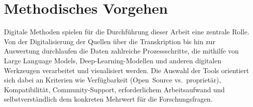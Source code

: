 \documentclass[12pt, a4paper, ngerman, bidi=default]{article}
\begin{document}



\section{Methodisches Vorgehen}

Digitale Methoden spielen für die Durchführung dieser Arbeit eine zentrale Rolle. Von der Digitalisierung der Quellen
über die Transkription bis hin zur Auswertung durchlaufen die Daten zahlreiche Prozessschritte, die mithilfe von Large 
Language Models, Deep-Learning-Modellen und anderen digitalen Werkzeugen verarbeitet und visualisiert werden. 
Die Auswahl der Tools orientiert sich dabei an Kriterien wie Verfügbarkeit (Open~Source vs.\ proprietär), 
Kompatibilität, Community-Support, erforderlichem Arbeitsaufwand und selbstverständlich dem konkreten Mehrwert für 
die Forschungsfragen.
\end{document}
